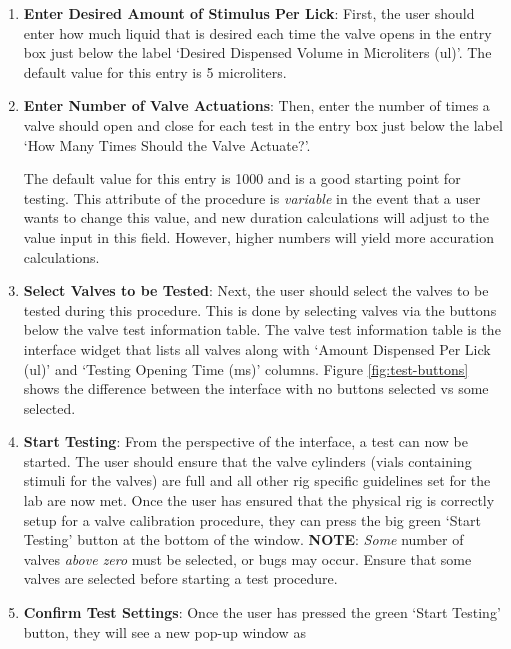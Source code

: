\documentclass{article}
\begin{document}
\begin{enumerate}
    \item \textbf{Enter Desired Amount of Stimulus Per Lick}: First, the user should enter how much liquid that is desired each time the valve 
        opens in the entry box just below the label `Desired Dispensed Volume in Microliters (ul)'. The default value for this entry is 5
        microliters.
    \item \textbf{Enter Number of Valve Actuations}: Then, enter the number of times a valve should open and close for each test in the entry 
        box just below the label `How Many Times Should the Valve Actuate?'. 

        The default value for this entry is 1000 and is a good starting 
        point for testing. This attribute of the procedure is \textit{variable} in the event that a user wants to change this value, and 
        new duration calculations will adjust to the value input in this field. However, higher numbers will yield more accuration calculations.
    \item \textbf{Select Valves to be Tested}: Next, the user should select the valves to be tested during this procedure. This is done by 
        selecting valves via the buttons below the valve test information table. The valve test information table is the interface widget that lists all valves along
        with `Amount Dispensed Per Lick (ul)' and `Testing Opening Time (ms)' columns. Figure \ref{fig:test-buttons} shows the difference 
        between the interface with no buttons selected vs some selected.
    \item \textbf{Start Testing}: From the perspective of the interface, a test can now be started. The user should ensure that the valve 
        cylinders (vials containing stimuli for the valves) are full and all other rig specific guidelines set for the lab are now met. Once 
        the user has ensured that the physical rig is correctly setup for a valve calibration procedure, they can press the big green 
        `Start Testing' button at the bottom of the window.
        \newline
        \newline
        \textbf{NOTE}: \textit{Some} number of valves \textit{above zero} must be selected, or bugs may occur. Ensure that some valves are 
        selected before starting a test procedure.
    \item \textbf{Confirm Test Settings}: Once the user has pressed the green `Start Testing' button, they will see a new pop-up window as 

\end{enumerate}
\end{document}
